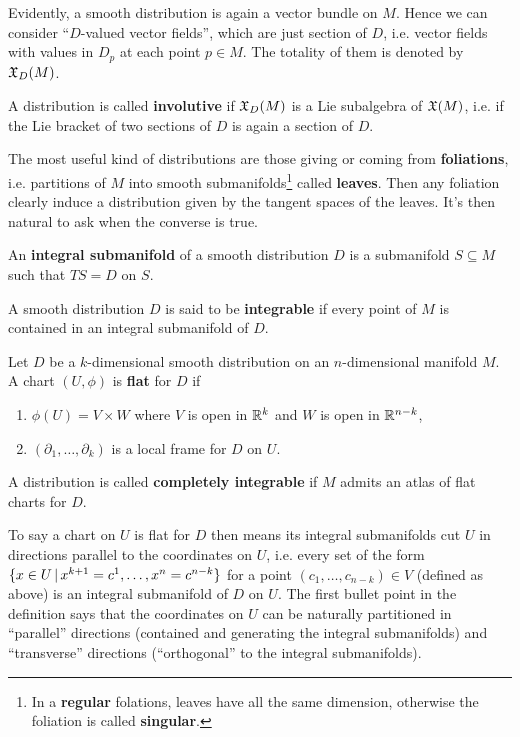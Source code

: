 \documentclass[main.tex]{subfiles}
\begin{document}
Evidently, a smooth distribution is again a vector bundle on $M$. Hence we can consider ``$D$-valued vector fields'', which are just section of $D$, i.e. vector fields with values in $D_p$ at each point $p \in M$. The totality of them is denoted by $\mathfrak{X}_D(M)$. 

\begin{definition}
	A distribution is called \textbf{involutive} if $\mathfrak{X}_D(M)$ is a Lie subalgebra of $\mathfrak{X}(M)$, i.e. if the Lie bracket of two sections of $D$ is again a section of $D$.
\end{definition}

The most useful kind of distributions are those giving or coming from \textbf{foliations}, i.e. partitions of $M$ into smooth submanifolds\footnote{In a \textbf{regular} folations, leaves have all the same dimension, otherwise the foliation is called \textbf{singular}.} called \textbf{leaves}. Then any foliation clearly induce a distribution given by the tangent spaces of the leaves. It's then natural to ask when the converse is true.

\begin{definition}
	An \textbf{integral submanifold} of a smooth distribution $D$ is a submanifold $S \subseteq M$ such that $TS = D$ on $S$.
\end{definition}

\begin{definition}
	A smooth distribution $D$ is said to be \textbf{integrable} if every point of $M$ is contained in an integral submanifold of $D$.
\end{definition}

\begin{definition}
	Let $D$ be a $k$-dimensional smooth distribution on an $n$-dimensional manifold $M$. A chart $(U,\phi)$ is \textbf{flat} for $D$ if
	\begin{enumerate}
		\item $\phi(U) = V \times W$ where $V$ is open in $\mathbb{R}^k$ and $W$ is open in $\mathbb{R}^{n-k}$,
		\item $(\partial_1, \ldots, \partial_k)$ is a local frame for $D$ on $U$.
	\end{enumerate}
	A distribution is called \textbf{completely integrable} if $M$ admits an atlas of flat charts for $D$.
\end{definition}

To say a chart on $U$ is flat for $D$ then means its integral submanifolds cut $U$ in directions parallel to the coordinates on $U$, i.e. every set of the form $\{x \in U \,|\, x^{k+1} = c^1, \ldots, x^n=c^{n-k}\}$ for a point $(c_1, \ldots, c_{n-k}) \in V$ (defined as above) is an integral submanifold of $D$ on $U$. The first bullet point in the definition says that the coordinates on $U$ can be naturally partitioned in ``parallel'' directions (contained and generating the integral submanifolds) and ``transverse'' directions (``orthogonal'' to the integral submanifolds).
\end{document}
